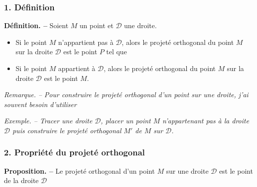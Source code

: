 \documentclass[handout]{beamer}
\newcommand{\pointilles}{{\\\rule{0pt}{1pt}\dotfill\rule{0pt}{1pt}}}
\newcommand{\rep}[1]{\foreach \n in {1,...,#1} {\pointilles}}
\begin{document}
\title{}

\date{}

\begin{frame}
  \frametitle{1. Définition}
  \textbf{Définition. --} Soient $M$ un point et $\mathcal{D}$ une droite.
    \begin{itemize}
      \item Si le point $M$ n'appartient pas à $\mathcal{D}$, alors le projeté orthogonal du point $M$ sur la droite $\mathcal{D}$ est le point $P$ tel que\\
	\dotfill
      \item Si le point $M$ appartient à $\mathcal{D}$, alors le projeté orthogonal du point $M$ sur la droite $\mathcal{D}$ est le point $M$.
    \end{itemize}

    \medskip

    \textit{Remarque. -- Pour construire le projeté orthogonal d'un point sur une droite, j'ai souvent besoin d'utiliser \dotfill}
\end{frame}

\begin{frame}
  \textit{Exemple. -- Tracer une droite $\mathcal{D}$, placer un point $M$ n'appartenant pas à la droite $\mathcal{D}$ puis construire le projeté orthogonal $M'$ de $M$ sur $\mathcal{D}$.}
  \vspace{7cm}
\end{frame}


\begin{frame}
  \frametitle{2. Propriété du projeté orthogonal}
  \textbf{Proposition. --} Le projeté orthogonal d'un point $M$ sur une droite $\mathcal{D}$ est le point de la droite $\mathcal{D}$ \dotfill

  \vspace{6cm}
\end{frame}
\end{document}
